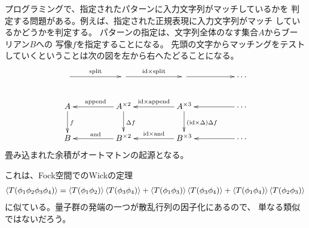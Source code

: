 	\begin{observation}[文字列のパターンマッチング]\label{obs:文字列のパターンマッチング} %
		プログラミングで、指定されたパターンに入力文字列がマッチしているかを
		判定する問題がある。例えば、指定された正規表現に入力文字列がマッチ
		しているかどうかを判定する。
		パターンの指定は、文字列全体のなす集合$A$からブーリアン$B$への
		写像$f$を指定することになる。
		先頭の文字からマッチングをテストしていくということは次の図を左から右へたどることになる。
		\begin{equation}\xymatrix@C+2pc{
			\ar[r]^{\myop{split}} & \ar[r]^{\myid\times \myop{split}} & \ar[r] & \cdots \\
			A \ar[d]^{f} 
				& A^{\times 2} \ar[l]_{\myop{append}} \ar[d]^{\Delta f}
				& A^{\times 3} \ar[l]_{\myid\times \myop{append}} \ar[d]^{(\myid\times \Delta)\Delta f} & \cdots \ar[l] \\
			B & B^{\times 2} \ar[l]_{\myop{and}} 
				& B^{\times 3} \ar[l]_{\myid\times \myop{and}} & \cdots \ar[l] \\
		}\end{equation}
		畳み込まれた余積がオートマトンの起源となる。
	\end{observation} %

	\begin{observation}[Wickの定理]\label{obs:Wickの定理} %
		これは、Fock空間でのWickの定理
		\begin{equation*}\begin{split} %
			\braket{T(\phi_1\phi_2\phi_3\phi_4)}
			=\braket{T(\phi_1\phi_2)}\braket{T(\phi_3\phi_4)}
			+\braket{T(\phi_1\phi_3)}\braket{T(\phi_3\phi_4)}
			+\braket{T(\phi_1\phi_4)}\braket{T(\phi_2\phi_3)}
		\end{split}\end{equation*} %
		に似ている。量子群の発端の一つが散乱行列の因子化にあるので、
		単なる類似ではないだろう。
	\end{observation} %

